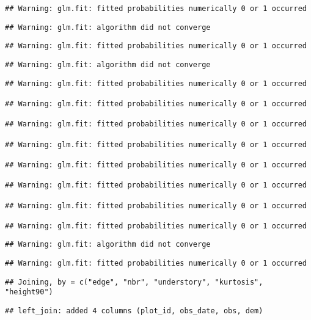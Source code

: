 \documentclass[
]{article}
\begin{document}
\begin{verbatim}
## Warning: glm.fit: fitted probabilities numerically 0 or 1 occurred
\end{verbatim}

\begin{verbatim}
## Warning: glm.fit: algorithm did not converge
\end{verbatim}

\begin{verbatim}
## Warning: glm.fit: fitted probabilities numerically 0 or 1 occurred
\end{verbatim}

\begin{verbatim}
## Warning: glm.fit: algorithm did not converge
\end{verbatim}

\begin{verbatim}
## Warning: glm.fit: fitted probabilities numerically 0 or 1 occurred

## Warning: glm.fit: fitted probabilities numerically 0 or 1 occurred

## Warning: glm.fit: fitted probabilities numerically 0 or 1 occurred

## Warning: glm.fit: fitted probabilities numerically 0 or 1 occurred

## Warning: glm.fit: fitted probabilities numerically 0 or 1 occurred

## Warning: glm.fit: fitted probabilities numerically 0 or 1 occurred

## Warning: glm.fit: fitted probabilities numerically 0 or 1 occurred

## Warning: glm.fit: fitted probabilities numerically 0 or 1 occurred
\end{verbatim}

\begin{verbatim}
## Warning: glm.fit: algorithm did not converge
\end{verbatim}

\begin{verbatim}
## Warning: glm.fit: fitted probabilities numerically 0 or 1 occurred
\end{verbatim}

\begin{verbatim}
## Joining, by = c("edge", "nbr", "understory", "kurtosis", "height90")
\end{verbatim}

\begin{verbatim}
## left_join: added 4 columns (plot_id, obs_date, obs, dem)
\end{verbatim}
\end{document}
